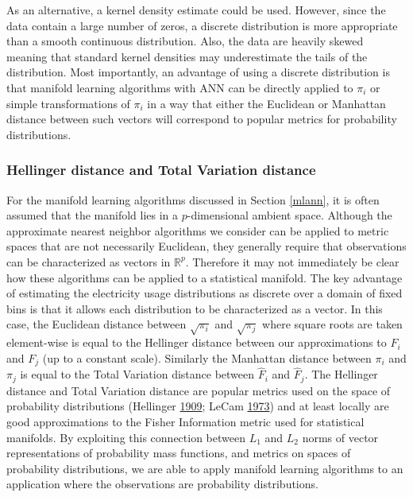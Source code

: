 \documentclass[12pt]{article}
\begin{document}
As an alternative, a kernel density estimate could be used. However, since the data contain a large number of zeros, a discrete distribution is more appropriate than a smooth continuous distribution. Also, the data are heavily skewed meaning that standard kernel densities may underestimate the tails of the distribution. Most importantly, an advantage of using a discrete distribution is that manifold learning algorithms with ANN can be directly applied to \(\pi_i\) or simple transformations of \(\pi_i\) in a way that either the Euclidean or Manhattan distance between such vectors will correspond to popular metrics for probability distributions.

\hypertarget{hellinger-distance-and-total-variation-distance}{%
\subsubsection*{Hellinger distance and Total Variation distance}\label{hellinger-distance-and-total-variation-distance}}

For the manifold learning algorithms discussed in Section \ref{mlann}, it is often assumed that the manifold lies in a \(p\)-dimensional ambient space. Although the approximate nearest neighbor algorithms we consider can be applied to metric spaces that are not necessarily Euclidean, they generally require that observations can be characterized as vectors in \(\mathbb{R}^p\). Therefore it may not immediately be clear how these algorithms can be applied to a statistical manifold. The key advantage of estimating the electricity usage distributions as discrete over a domain of fixed bins is that it allows each distribution to be characterized as a vector. In this case, the Euclidean distance between \(\sqrt{\pi_{i}}\) and \(\sqrt{\pi_{j}}\) where square roots are taken element-wise is equal to the Hellinger distance between our approximations to \(F_{i}\) and \(F_{j}\) (up to a constant scale). Similarly the Manhattan distance between \(\pi_{i}\) and \(\pi_{j}\) is equal to the Total Variation distance between \(\hat{F}_{i}\) and \(\hat{F}_{j}\). The Hellinger distance and Total Variation distance are popular metrics used on the space of probability distributions (Hellinger \protect\hyperlink{ref-Hellinger_undated-rs}{1909}; LeCam \protect\hyperlink{ref-lecam1973}{1973}) and at least locally are good approximations to the Fisher Information metric used for statistical manifolds. By exploiting this connection between \(L_1\) and \(L_2\) norms of vector representations of probability mass functions, and metrics on spaces of probability distributions, we are able to apply manifold learning algorithms to an application where the observations are probability distributions.
\end{document}

